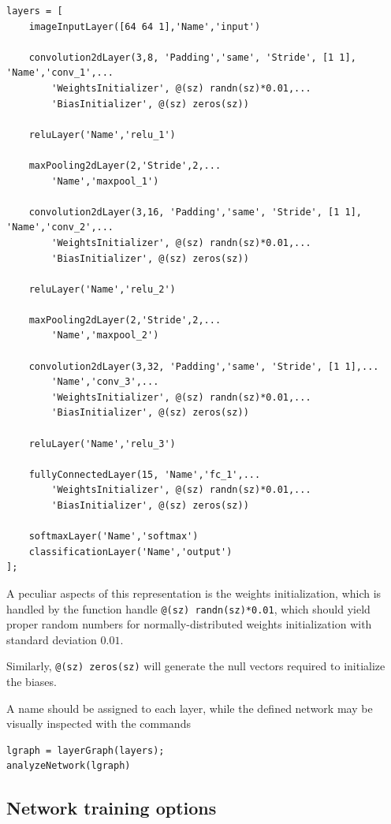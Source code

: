 \documentclass[a4paper, 11pt]{article} %
\begin{document}
\begin{lstlisting}
layers = [
    imageInputLayer([64 64 1],'Name','input')
    
    convolution2dLayer(3,8, 'Padding','same', 'Stride', [1 1], 'Name','conv_1',...
        'WeightsInitializer', @(sz) randn(sz)*0.01,...
        'BiasInitializer', @(sz) zeros(sz))

    reluLayer('Name','relu_1')

    maxPooling2dLayer(2,'Stride',2,...
        'Name','maxpool_1')

    convolution2dLayer(3,16, 'Padding','same', 'Stride', [1 1], 'Name','conv_2',...
        'WeightsInitializer', @(sz) randn(sz)*0.01,...
        'BiasInitializer', @(sz) zeros(sz))

    reluLayer('Name','relu_2')

    maxPooling2dLayer(2,'Stride',2,...
        'Name','maxpool_2')

    convolution2dLayer(3,32, 'Padding','same', 'Stride', [1 1],...
        'Name','conv_3',...
        'WeightsInitializer', @(sz) randn(sz)*0.01,...
        'BiasInitializer', @(sz) zeros(sz))

    reluLayer('Name','relu_3')

    fullyConnectedLayer(15, 'Name','fc_1',...
        'WeightsInitializer', @(sz) randn(sz)*0.01,...
        'BiasInitializer', @(sz) zeros(sz))

    softmaxLayer('Name','softmax')
    classificationLayer('Name','output')
];

\end{lstlisting}

A peculiar aspects of this representation is the weights initialization, which is handled by the function handle \texttt{@(sz) randn(sz)*0.01}, which should yield proper random numbers for normally-distributed weights initialization with standard deviation $0.01$. 

Similarly, \texttt{@(sz) zeros(sz)} will generate the null vectors required to initialize the biases.

A name should be assigned to each layer, while the defined network may be visually inspected with the commands

\begin{lstlisting}
lgraph = layerGraph(layers);
analyzeNetwork(lgraph)
\end{lstlisting}

\subsection{Network training options}
\end{document}
